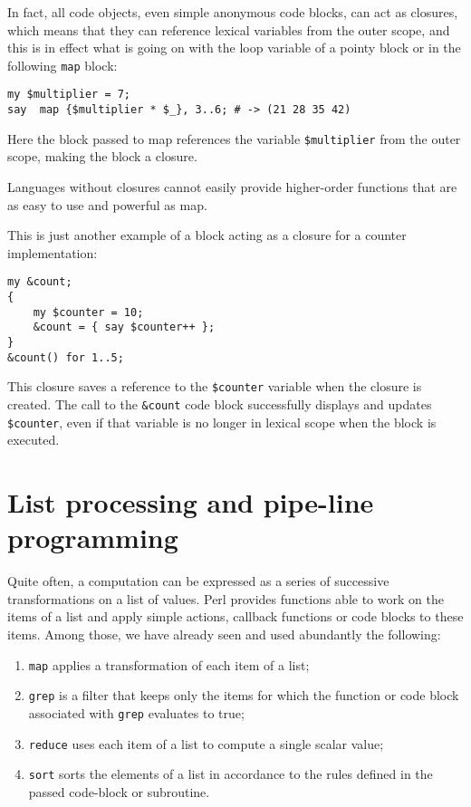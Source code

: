 In fact, all code objects, even simple anonymous code 
blocks, can act as closures, which means that they can 
reference lexical variables from the outer scope, and this 
is in effect what is going on with the loop variable of 
a pointy block or in the following {\tt map} block:

\begin{verbatim}
my $multiplier = 7;
say  map {$multiplier * $_}, 3..6; # -> (21 28 35 42)
\end{verbatim}

Here the block passed to map references the variable 
\verb'$multiplier' from the outer scope, making the 
block a closure.

Languages without closures cannot easily provide 
higher-order functions that are as easy to use and 
powerful as map.

This is just another example of a block acting as a 
closure for a counter implementation:

\begin{verbatim}
my &count;
{
    my $counter = 10;
    &count = { say $counter++ };
}
&count() for 1..5;  
\end{verbatim}

This closure saves a reference to the \verb'$counter' 
variable when the closure is created. The call to the 
\verb'&count' code block successfully displays and 
updates \verb'$counter', even if that variable is no
longer in lexical scope when the block is executed.

\section{List processing and pipe-line programming}

Quite often, a computation can be expressed as a 
series of successive transformations on a list of 
values. Perl provides functions able to work on 
the items of a list and apply simple actions, 
callback functions or code blocks to these items. 
Among those, we have already seen and used abundantly 
the following:
\begin{enumerate}
\item {\tt map} applies a transformation of each item 
of a list;
\item {\tt grep} is a filter that keeps only the items 
for which the function or code block associated with 
{\tt grep} evaluates to true;
\item {\tt reduce} uses each item of a list to compute 
a single scalar value;
\item {\tt sort} sorts the elements of a list in accordance 
to the rules defined in the passed code-block or 
subroutine. 
\end{enumerate}

